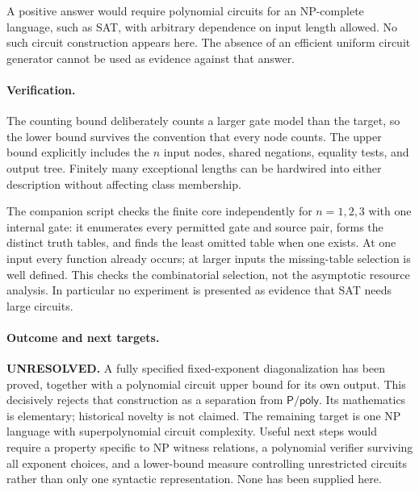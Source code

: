 \documentclass[11pt]{article}
\begin{document}
A positive answer would require polynomial circuits for an NP-complete
language, such as SAT, with arbitrary dependence on input length allowed.
No such circuit construction appears here. The absence of an efficient
uniform circuit generator cannot be used as evidence against that answer.

\paragraph{Verification.}
The counting bound deliberately counts a larger gate model than the target,
so the lower bound survives the convention that every node counts. The
upper bound explicitly includes the $n$ input nodes, shared negations,
equality tests, and output tree. Finitely many exceptional lengths can be
hardwired into either description without affecting class membership.

The companion script checks the finite core independently for $n=1,2,3$
with one internal gate: it enumerates every permitted gate and source pair,
forms the distinct truth tables, and finds the least omitted table when one
exists. At one input every function already occurs; at larger inputs the
missing-table selection is well defined. This checks the combinatorial
selection, not the asymptotic resource analysis. In particular no experiment
is presented as evidence that SAT needs large circuits.

\paragraph{Outcome and next targets.}
\textbf{UNRESOLVED.} A fully specified fixed-exponent diagonalization has been
proved, together with a polynomial circuit upper bound for its own output.
This decisively rejects that construction as a separation from
$\mathsf{P/poly}$. Its mathematics is elementary; historical novelty is not
claimed. The remaining target is one NP language with superpolynomial
circuit complexity. Useful next steps would require a property specific to
NP witness relations, a polynomial verifier surviving all exponent choices,
and a lower-bound measure controlling unrestricted circuits rather than
only one syntactic representation. None has been supplied here.
\end{document}
